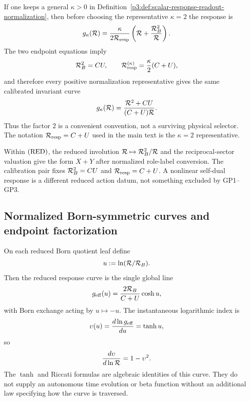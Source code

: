 \documentclass[12pt,a4paper]{article}
\begin{document}
\begin{remark}
\label{p3d:rem:response-normalization-invariance}
If one keeps a general \(\kappa>0\) in
Definition~\ref{p3:def:scalar-response-readout-normalization}, then before
choosing the representative \(\kappa=2\) the response is
\[
 g_\kappa(\mathcal R)
 =\frac{\kappa}{2\mathcal R_{\rm resp}}
  \left(\mathcal R+\frac{\mathcal R_B^2}{\mathcal R}\right).
\]
The two endpoint equations imply
\[
 \mathcal R_B^2=CU,
 \qquad
 \mathcal R_{\rm resp}^{(\kappa)}=\frac\kappa2(C+U),
\]
and therefore every positive normalization representative gives the same
calibrated invariant curve
\[
 g_\kappa(\mathcal R)
 =\frac{\mathcal R^2+CU}{(C+U)\mathcal R}.
\]
Thus the factor \(2\) is a convenient convention, not a surviving physical
selector.  The notation \(\mathcal R_{\rm resp}=C+U\) used in the main text is the
\(\kappa=2\) representative.
\end{remark}


\begin{remark}
\label{p3:rem:geff_status}
Within \(({\rm RED})\), the reduced involution
\(\mathcal R\mapsto \mathcal R_B^2/\mathcal R\) and the reciprocal-sector valuation give
the form \(X+Y\) after normalized role-label conversion.  The calibration
pair fixes \(\mathcal R_B^2=CU\) and \(\mathcal R_{\rm resp}=C+U\).  A nonlinear
self-dual response is a different reduced action datum, not something
excluded by GP1--GP3.
\end{remark}

\subsection{Normalized Born-symmetric curves and endpoint factorization}
\begin{corollary}
\label{p3:cor:fully_derived_one_parameter_trajectory}
On each reduced Born quotient leaf define
\[
        u:=\ln(\mathcal R/\mathcal R_B).
\]
Then the reduced response curve is the single global line
\[
        g_{\mathrm{eff}}(u)=\frac{2\mathcal R_B}{C+U}\cosh u,
\]
with Born exchange acting by \(u\mapsto -u\).  The instantaneous logarithmic index is
\[
        \upsilon(u)=\frac{d\ln g_{\mathrm{eff}}}{du}=\tanh u,
\]
so
\[
        \frac{d\upsilon}{d\ln\mathcal R}=1-\upsilon^2.
\]
The \(\tanh\) and Riccati formulas are algebraic identities of this curve.
They do not supply an autonomous time evolution or beta function without an
additional law specifying how the curve is traversed.
\end{corollary}
\end{document}
